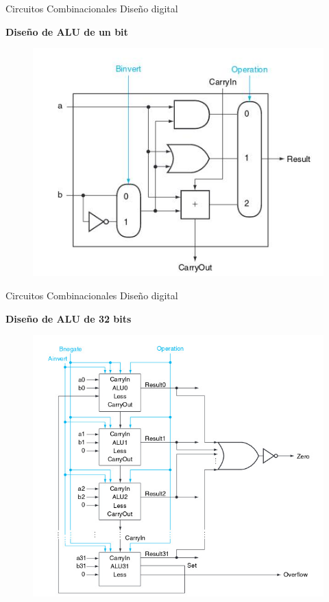 \documentclass[aspectratio=169,compress]{beamer}
\begin{document}
\begin{footnotesize}
\begin{frame} {Circuitos Combinacionales} {Diseño digital}
\begin{center}\textbf{Diseño de ALU de un bit}\end{center}
\begin{figure}
\includegraphics[scale=0.4]{images/alu1bit-4.jpg} 
\end{figure}
\end{frame}


\begin{frame} {Circuitos Combinacionales} {Diseño digital}
\begin{center}\textbf{Diseño de ALU de 32 bits}\end{center}
\begin{figure}
\includegraphics[scale=0.4]{images/alu1bit-5.jpg} 
\end{figure}
\end{frame}



\end{footnotesize}
\end{document}
